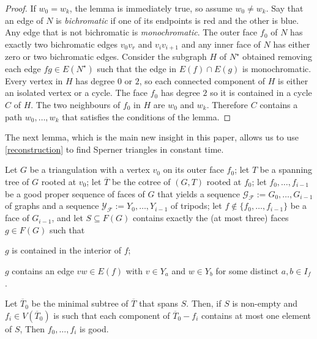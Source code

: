 \documentclass{patmorin}
\begin{document}
\begin{proof}
  If $w_0=w_k$, the lemma is immediately true, so assume $w_0\neq w_k$.
  Say that an edge of $N$ is \emph{bichromatic} if one of its endpoints is red and the other is blue.  Any edge that is not bichromatic is \emph{monochromatic}.  The outer face $f_0$ of $N$ has exactly two bichromatic edges $v_0v_r$ and $v_iv_{i+1}$ and any inner face of $N$ has either zero or two bichromatic edges.  Consider the subgraph $H$ of $N^\star$ obtained removing each edge $fg\in E(N^\star)$ such that the edge in $E(f)\cap E(g)$ is monochromatic.  Every vertex in $H$ has degree $0$ or $2$, so each connected component of $H$ is either an isolated vertex or a cycle.  The face $f_0$ has degree $2$ so it is contained in a cycle $C$ of $H$.  The two neighbours of $f_0$ in $H$ are $w_0$ and $w_k$. Therefore $C$ contains a path $w_0,\ldots,w_k$ that satisfies the conditions of the lemma.
\end{proof}

The next lemma, which is the main new insight in this paper, allows us to use \cref{reconstruction} to find Sperner triangles in constant time.

\begin{lem}\label{lca_sperner}
  Let $G$ be a triangulation with a vertex $v_0$ on its outer face $f_0$; let $T$ be a spanning tree of $G$ rooted at $v_0$; let $\overline{T}$ be the cotree of $(G,T)$ rooted at $f_0$; let $f_0,\ldots,f_{i-1}$ be a good proper sequence of faces of $G$ that yields a sequence $\mathcal{G_F}:=G_0,\ldots,G_{i-1}$ of graphs and a sequence $\mathcal{Y_F}:=Y_0,\ldots,Y_{i-1}$ of tripods; let $f\not\in \{f_0,\ldots,f_{i-1}\}$ be a face of $G_{i-1}$, and let $S\subseteq F(G)$ contains exactly the (at most three) faces $g\in F(G)$ such that
  \begin{compactenum}[(i)]
      \item $g$ is contained in the interior of $f$;
      \item $g$ contains an edge $vw\in E(f)$ with $v\in Y_a$ and $w\in Y_b$ for some distinct $a,b\in I_f$.
  \end{compactenum}
  Let $\overline{T}_0$ be the minimal subtree of $\overline{T}$ that spans $S$.  Then, if $S$ is non-empty and $f_i\in V(\overline{T}_0)$ is such that each component of $\overline{T}_0-f_i$ contains at most one element of $S$,
  Then $f_0,\ldots,f_i$ is good.
\end{lem}
\end{document}
